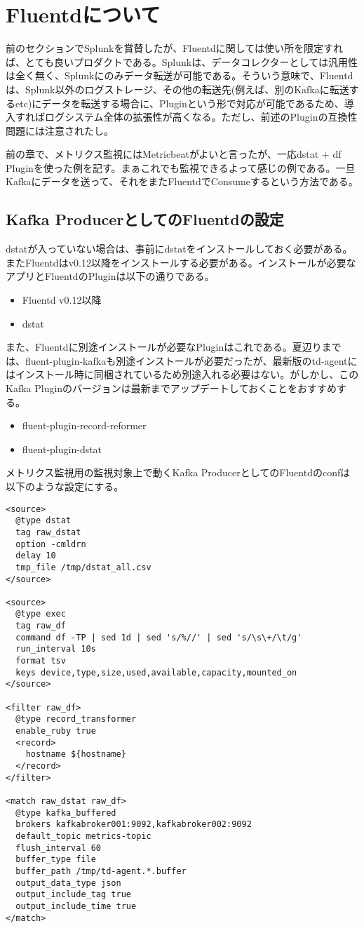 \section{Fluentdについて}
前のセクションでSplunkを賞賛したが、Fluentdに関しては使い所を限定すれば、とても良いプロダクトである。Splunkは、データコレクターとしては汎用性は全く無く、Splunkにのみデータ転送が可能である。そういう意味で、Fluentdは、Splunk以外のログストレージ、その他の転送先(例えば、別のKafkaに転送するetc)にデータを転送する場合に、Pluginという形で対応が可能であるため、導入すればログシステム全体の拡張性が高くなる。ただし、前述のPluginの互換性問題には注意されたし。

前の章で、メトリクス監視にはMetricbeatがよいと言ったが、一応dstat + df Pluginを使った例を記す。まぁこれでも監視できるよって感じの例である。一旦Kafkaにデータを送って、それをまたFluentdでConsumeするという方法である。

\subsection{Kafka ProducerとしてのFluentdの設定}
dstatが入っていない場合は、事前にdstatをインストールしておく必要がある。またFluentdはv0.12以降をインストールする必要がある。インストールが必要なアプリとFluentdのPluginは以下の通りである。

\begin{itemize}
	\item Fluentd v0.12以降
	\item dstat
\end{itemize}

また、Fluentdに別途インストールが必要なPluginはこれである。夏辺りまでは、fluent-plugin-kafkaも別途インストールが必要だったが、最新版のtd-agentにはインストール時に同梱されているため別途入れる必要はない。がしかし、このKafka Pluginのバージョンは最新までアップデートしておくことをおすすめする。

\begin{itemize}
	\item fluent-plugin-record-reformer
	\item fluent-plugin-dstat
\end{itemize}

メトリクス監視用の監視対象上で動くKafka ProducerとしてのFluentdのconfは以下のような設定にする。

\begin{lstlisting}
<source>
  @type dstat
  tag raw_dstat
  option -cmldrn
  delay 10
  tmp_file /tmp/dstat_all.csv
</source>

<source>
  @type exec
  tag raw_df
  command df -TP | sed 1d | sed 's/%//' | sed 's/\s\+/\t/g'
  run_interval 10s
  format tsv
  keys device,type,size,used,available,capacity,mounted_on
</source>

<filter raw_df>
  @type record_transformer
  enable_ruby true
  <record>
    hostname ${hostname}
  </record>
</filter>

<match raw_dstat raw_df>
  @type kafka_buffered
  brokers kafkabroker001:9092,kafkabroker002:9092
  default_topic metrics-topic
  flush_interval 60
  buffer_type file
  buffer_path /tmp/td-agent.*.buffer
  output_data_type json
  output_include_tag true
  output_include_time true
</match>
\end{lstlisting}

